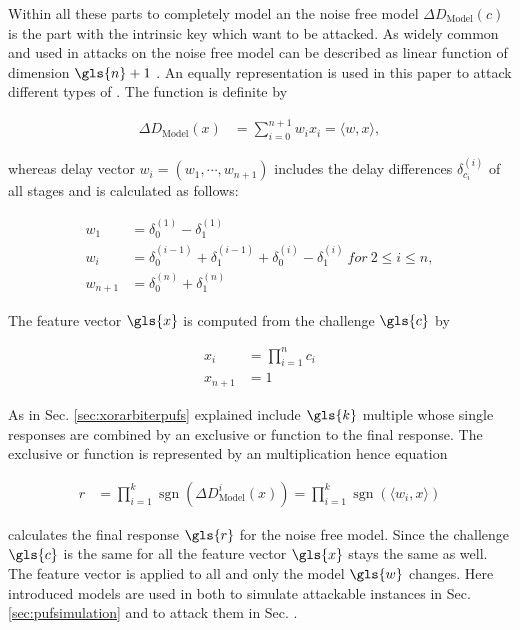 Within all these parts to completely model an \apuf the noise free model $\Delta D_{\mathrm{Model}}(c)$ is the part with the intrinsic key which want to be attacked.
As widely common and used in attacks on \apuf the noise free model can be described as linear function of dimension $\gls{n} + 1$ \cite{Majzoobi2008TestingSecurity} \cite{Majzoobi2008LightweightPUFs} \cite{Ruhrmair2010ModelingFunctions} \cite{Becker2015ThePUFs}.
An equally representation is used in this paper to attack different types of \apufs.
The function is definite by

\begin{align*}
\Delta D_{\mathrm{Model}}(x) &= \sum_{i=0}^{n+1} w_i x_i = \langle w,x\rangle,
\end{align*}

whereas delay vector $w_i = (w_1, \cdots, w_{n+1})$ includes the delay differences $\delta_{c_i}^{(i)}$ of all stages and is calculated as follows:

\begin{align*}
w_1 &= \delta_{0}^{(1)} - \delta_{1}^{(1)}\\
w_i &= \delta_{0}^{(i-1)} + \delta_{1}^{(i-1)} + \delta_{0}^{(i)} - \delta_{1}^{(i)}\ for\ 2 \le i \le n,\\
w_{n+1} &= \delta_{0}^{(n)} + \delta_{1}^{(n)}
\end{align*}
 
The feature vector $\gls{x}$ is computed from the challenge $\gls{c}$ by

\begin{align*}
x_i &= \prod_{i=1}^n c_i\\
x_{n+1} &= 1
\end{align*}

As in Sec. \ref{sec:xorarbiterpufs} explained \xpufs include $\gls{k}$ multiple \apufs whose single responses are combined by an exclusive or function to the final response.
The exclusive or function is represented by an multiplication hence equation

\begin{align*}
r &= \prod_{i=1}^k \operatorname{sgn}(\Delta D_{\mathrm{Model}}^i(x)) = \prod_{i=1}^k \operatorname{sgn}(\langle w_i,x\rangle)
\end{align*}

calculates the final response $\gls{r}$ for the noise free \xpuf model.
Since the challenge $\gls{c}$ is the same for all \apufs the feature vector $\gls{x}$ stays the same as well.
The feature vector is applied to all \apufs and only the \apuf model $\gls{w}$ changes.
Here introduced models are used in both to simulate attackable \apuf instances in Sec. \ref{sec:pufsimulation} and to attack them in Sec. .

